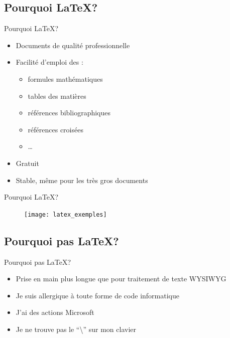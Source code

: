 \documentclass[10pt,svgnames,usenames,table]{beamer} %
\begin{document}
\subsection{Pourquoi \LaTeX{}?}
\begin{frame}{Pourquoi \LaTeX{}?}

  \begin{itemize}
  	\item Documents de qualité professionnelle
	\item Facilité d'emploi des :
	\begin{itemize}
		\item formules mathématiques
		\item tables des matières
		\item références bibliographiques
		\item références croisées
        \item \ldots{}
	\end{itemize}
	\item Gratuit
	\item Stable, même pour les très gros documents
  \end{itemize}
\end{frame}

\begin{frame}{Pourquoi \LaTeX{}?}

\begin{figure}[htbp]
\begin{center}
\texttt{[image: latex\_exemples]}
\end{center}
\end{figure}
\end{frame}

\subsection{Pourquoi pas \LaTeX{}?}
\begin{frame}{Pourquoi pas \LaTeX{}?}

  \begin{itemize}
	\item Prise en main plus longue que pour traitement de texte WYSIWYG
	\item Je suis allergique à toute forme de code informatique
	\item J'ai des actions Microsoft
	\item Je ne trouve pas le ``\textbackslash'' sur mon clavier
  \end{itemize}
\end{frame}
\end{document}
